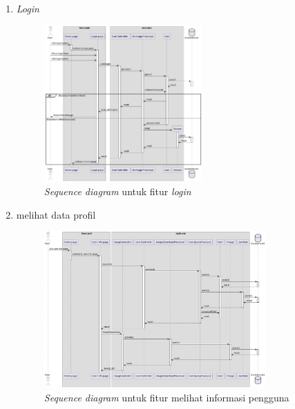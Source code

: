 \documentclass[a4paper]{article}
\begin{document}
\begin{enumerate}
\begin{enumerate}
        \item \textit{Login}\\
        \begin{figure}[h]
            \centering
            \includegraphics*[height=6cm]{diagram/sequence diagram/3. login/login.png}
            \caption{\textit{Sequence diagram} untuk fitur \textit{login}}
        \end{figure}
        \item melihat data profil\\
        \begin{figure}[h]
            \centering
            \includegraphics*[height=6cm]{diagram/sequence diagram/4. see user info/see user info.png}
            \caption{\textit{Sequence diagram} untuk fitur melihat informasi pengguna}
        \end{figure}
        \newpage
        

\end{enumerate}
\end{enumerate}
\end{document}
